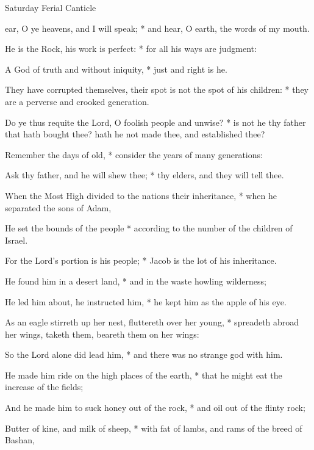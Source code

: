 \begin{multicols}{2}
\begin{inhead}
Saturday Ferial Canticle
\end{inhead}
 ear, O ye heavens, and I will speak; * and hear, O earth, the words of my mouth.\par
{}
He is the Rock, his work is perfect: * for all his ways are judgment:\par
A God of truth and without iniquity, * just and right is he.\par
They have corrupted themselves, {\dag} their spot is not the spot of his children: * they are a perverse and crooked generation.\par
Do ye thus requite the Lord, O foolish people and unwise? * is not he thy father that hath bought thee? hath he not made thee, and established thee?\par
Remember the days of old, * consider the years of many generations:\par
Ask thy father, and he will shew thee; * thy elders, and they will tell thee.\par
When the Most High divided to the nations their inheritance, * when he separated the sons of Adam,\par
He set the bounds of the people * according to the number of the children of Israel.\par
For the Lord's portion is his people; * Jacob is the lot of his inheritance.\par
He found him in a desert land, * and in the waste howling wilderness;\par
He led him about, he instructed him, * he kept him as the apple of his eye.\par
As an eagle stirreth up her nest, fluttereth over her young, * spreadeth abroad her wings, taketh them, beareth them on her wings:\par
So the Lord alone did lead him, * and there was no strange god with him.\par
He made him ride on the high places of the earth, * that he might eat the increase of the fields;\par
And he made him to suck honey out of the rock, * and oil out of the flinty rock;\par
Butter of kine, and milk of sheep, * with fat of lambs, and rams of the breed of Bashan,\par

\end{multicols}
